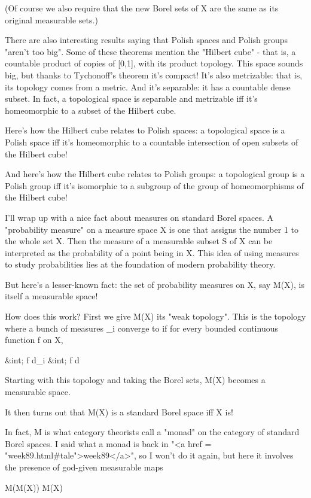 (Of course we also require that the new Borel sets of X are the 
same as its original measurable sets.)

There are also interesting results saying that Polish spaces and
Polish groups "aren't too big".  Some of these theorems mention the
"Hilbert cube" - that is, a countable product of copies of [0,1], 
with its product topology.  This space sounds big, but thanks to 
Tychonoff's theorem it's compact!  It's also metrizable: that is,
its topology comes from a metric.  And it's separable: it has a
countable dense subset.  In fact, a topological space is separable
and metrizable iff it's homeomorphic to a subset of the Hilbert cube.  

Here's how the Hilbert cube relates to Polish spaces: a topological
space is a Polish space iff it's homeomorphic to a countable 
intersection of open subsets of the Hilbert cube!

And here's how the Hilbert cube relates to Polish groups: a 
topological group is a Polish group iff it's isomorphic to a
subgroup of the group of homeomorphisms of the Hilbert cube!

I'll wrap up with a nice fact about measures on standard Borel 
spaces.  A "probability measure" on a measure space X is one that
assigns the number 1 to the whole set X.  Then the measure of a
measurable subset S of X can be interpreted as the probability
of a point being in X.  This idea of using measures to study
probabilities lies at the foundation of modern probability theory.

But here's a lesser-known fact: the set of probability measures on X,
say M(X), is itself a measurable space!

How does this work?  First we give M(X) its "weak topology".
This is the topology where a bunch of measures \mu _{i} converge to
\mu  if for every bounded continuous function f on X, 

&int; f d\mu _{i} \to  &int; f d\mu 

Starting with this topology and taking the Borel sets, M(X)
becomes a measurable space.

It then turns out that M(X) is a standard Borel space iff X is!

In fact, M is what category theorists call a "monad" on the category
of standard Borel spaces.  I said what a monad is back in "<a href =
"week89.html#tale">week89</a>", so I won't do it again, but here it
involves the presence of god-given measurable maps

M(M(X)) \to  M(X)  

